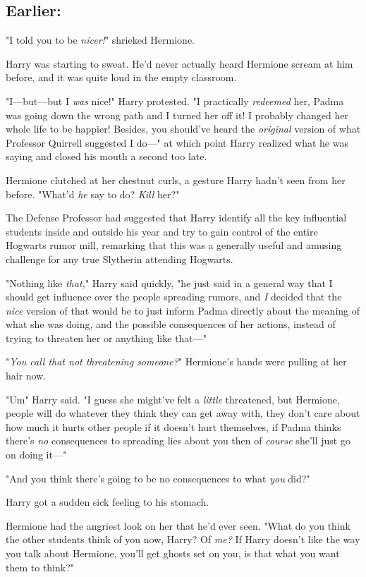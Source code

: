 \subsection{Earlier:}

"I told you to be \emph{nicer!}" shrieked Hermione.

Harry was starting to sweat. He'd never actually heard Hermione scream at him
before, and it was quite loud in the empty classroom.

"I—but—but I \emph{was} nice!" Harry protested. "I practically
\emph{redeemed} her, Padma was going down the wrong path and I turned her off
it! I probably changed her whole life to be happier! Besides, you should've
heard the \emph{original} version of what Professor Quirrell suggested I do—"
at which point Harry realized what he was saying and closed his mouth a second
too late.

Hermione clutched at her chestnut curls, a gesture Harry hadn't seen from her
before. "What'd \emph{he} say to do? \emph{Kill} her?"

The Defense Professor had suggested that Harry identify all the key influential
students inside and outside his year and try to gain control of the entire
Hogwarts rumor mill, remarking that this was a generally useful and amusing
challenge for any true Slytherin attending Hogwarts.

"Nothing like \emph{that,}" Harry said quickly, "he just said in a general way
that I should get influence over the people spreading rumors, and \emph{I}
decided that the \emph{nice} version of that would be to just inform Padma
directly about the meaning of what she was doing, and the possible consequences
of her actions, instead of trying to threaten her or anything like that—"

"\emph{You call that not threatening someone?}" Hermione's hands were pulling
at her hair now.

"Um{\el}" Harry said. "I guess she might've felt a \emph{little} threatened,
but Hermione, people will do whatever they think they can get away with, they
don't care about how much it hurts other people if it doesn't hurt themselves,
if Padma thinks there's \emph{no} consequences to spreading lies about you then
of \emph{course} she'll just go on doing it—"

"And you think there's going to be no consequences to what \emph{you} did?"

Harry got a sudden sick feeling to his stomach.

Hermione had the angriest look on her that he'd ever seen. "What do you think
the other students think of you now, Harry? Of \emph{me?} If Harry doesn't like
the way you talk about Hermione, you'll get ghosts set on you, is that what you
want them to think?"

